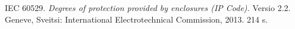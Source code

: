 \documentclass[finnish,12pt,a4paper,pdftex,elec,utf8]{aaltothesis}
\begin{document}
\begin{thebibliography}{99}
IEC 60529. \textit{Degrees of protection provided by enclosures (IP Code).} Versio 2.2. Geneve, Sveitsi: International Electrotechnical Commission, 2013. 214 s.









































\end{thebibliography}



\clearpage

\thesisappendix
\end{document}
